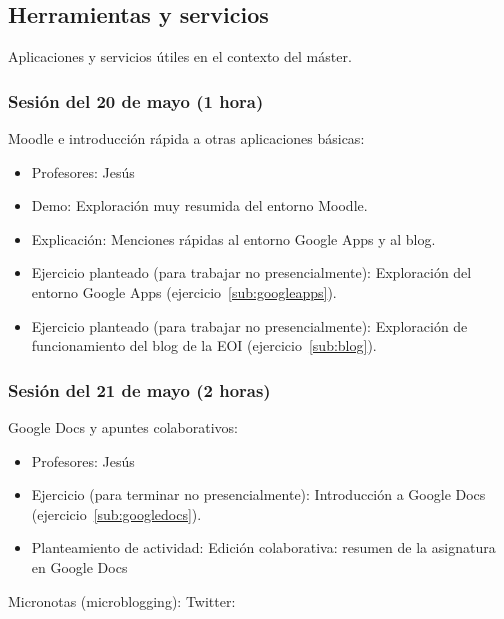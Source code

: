 \documentclass[a4paper,12pt]{article}
\begin{document}
\subsection{Herramientas y servicios}

Aplicaciones y servicios útiles en el contexto del máster.

\subsubsection{Sesión del 20 de mayo (1 hora)}

Moodle e introducción rápida a otras aplicaciones básicas:

\begin{itemize}
\item Profesores: Jesús
\item Demo: Exploración muy resumida del entorno Moodle.
\item Explicación: Menciones rápidas al entorno Google Apps y al blog.
\item Ejercicio planteado (para trabajar no presencialmente): Exploración del entorno Google Apps (ejercicio~\ref{sub:googleapps}).
\item Ejercicio planteado (para trabajar no presencialmente): Exploración de funcionamiento del blog de la EOI (ejercicio~\ref{sub:blog}).
\end{itemize}

\subsubsection{Sesión del 21 de mayo (2 horas)}

Google Docs y apuntes colaborativos:

\begin{itemize}
\item Profesores: Jesús
\item Ejercicio (para terminar no presencialmente): Introducción a Google Docs (ejercicio~\ref{sub:googledocs}).
\item Planteamiento de actividad: Edición colaborativa: resumen de la asignatura en Google Docs
\end{itemize}

Micronotas (microblogging): Twitter:
\end{document}
